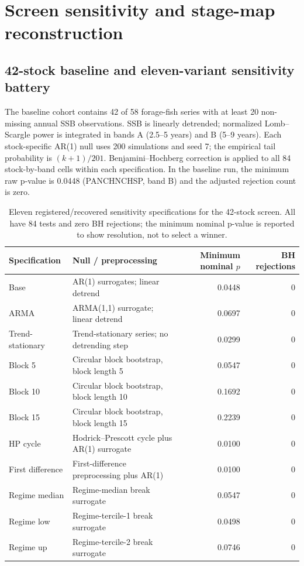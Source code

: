 \section{Screen sensitivity and stage-map reconstruction}\label{si:screen-stage}

\subsection{42-stock baseline and eleven-variant sensitivity battery}

The baseline cohort contains 42 of 58 forage-fish series with at least 20 non-missing annual SSB observations. SSB is linearly detrended; normalized Lomb--Scargle power is integrated in bands A (2.5--5 years) and B (5--9 years). Each stock-specific AR(1) null uses 200 simulations and seed 7; the empirical tail probability is \((k+1)/201\). Benjamini--Hochberg correction is applied to all 84 stock-by-band cells within each specification. In the baseline run, the minimum raw p-value is 0.0448 (PANCHNCHSP, band B) and the adjusted rejection count is zero.

\begin{table}[htbp]
\centering\small
\caption{Eleven registered/recovered sensitivity specifications for the 42-stock screen. All have 84 tests and zero BH rejections; the minimum nominal p-value is reported to show resolution, not to select a winner.}
\label{tab:screen-battery}
\begin{tabularx}{\linewidth}{@{}lXrr@{}}
\toprule Specification & Null / preprocessing & Minimum nominal \(p\) & BH rejections \\
\midrule
Base & AR(1) surrogates; linear detrend & 0.0448 & 0 \\
ARMA & ARMA(1,1) surrogate; linear detrend & 0.0697 & 0 \\
Trend-stationary & Trend-stationary series; no detrending step & 0.0299 & 0 \\
Block 5 & Circular block bootstrap, block length 5 & 0.0547 & 0 \\
Block 10 & Circular block bootstrap, block length 10 & 0.1692 & 0 \\
Block 15 & Circular block bootstrap, block length 15 & 0.2239 & 0 \\
HP cycle & Hodrick--Prescott cycle plus AR(1) surrogate & 0.0100 & 0 \\
First difference & First-difference preprocessing plus AR(1) & 0.0100 & 0 \\
Regime median & Regime-median break surrogate & 0.0547 & 0 \\
Regime low & Regime-tercile-1 break surrogate & 0.0498 & 0 \\
Regime up & Regime-tercile-2 break surrogate & 0.0746 & 0 \\
\bottomrule
\end{tabularx}
\end{table}


